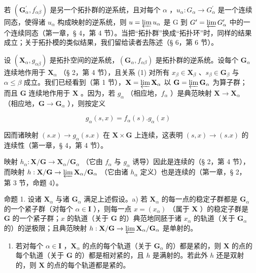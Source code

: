 若 \((\mathbf{G}_{\alpha}^{\prime}, f_{\alpha\beta}^{\prime})\) 是另一个拓扑群的逆系统，且对每个 \(\alpha\) ，\(u_{\alpha}: G_{\alpha} \to G_{\alpha}^{\prime}\) 是一个连续同态，使得诸 \(u_{\alpha}\) 构成映射的逆系统，则 \(u = \varprojlim u_{\alpha}\) 是 G 到 \(G^{\prime} = \varprojlim G_{\alpha}^{\prime}\) 中的一个连续同态（第一章，§ 4，第 4 节）。当把“拓扑群”换成“拓扑环”时，同样的结果成立；关于拓扑模的类似结果，我们留给读者去陈述（§ 6，第 6 节）。

设 \((\mathbf{X}_{\alpha}, g_{\alpha \beta})\) 是拓扑空间的逆系统，\((\mathbf{G}_{\alpha}, f_{\alpha \beta})\) 是拓扑群的逆系统。设每个 \(\mathbf{G}_{\alpha}\) 连续地作用于 \(\mathbf{X}_{\alpha}\) （§ 2，第 4 节），且关系 (1) 对所有 \(x_{\beta} \in \mathbf{X}_{\beta}\) 、\(s_{\beta} \in \mathbf{G}_{\beta}\) 与 \(\alpha \leqslant \beta\) 成立。我们已经看到（第 1 节），\(\mathbf{X} = \varprojlim \mathbf{X}_{\alpha}\) 以 \(\mathbf{G} = \varprojlim \mathbf{G}_{\alpha}\) 为算子群；而且 \(\mathbf{G}\) 连续地作用于 \(\mathbf{X}\) 。因为，若 \(g_{\alpha}\) （相应地，\(f_{\alpha}\) ）是典范映射 \(\mathbf{X} \to \mathbf{X}_{\alpha}\) （相应地，\(\mathbf{G} \to \mathbf{G}_{\alpha}\) ），则按定义

\[
g _ {\alpha} (s, x) = f _ {\alpha} (s). g _ {\alpha} (x)
\]

因而诸映射 \((s.x) \to g_{\alpha}(s.x)\) 在 \(\mathbf{X} \times \mathbf{G}\) 上连续，这表明 \((s, x) \to (s.x)\) 的连续性（第一章，§ 4，第 4 节）。

映射 \(h_{\alpha}: \mathbf{X} / \mathbf{G} \to \mathbf{X}_{\alpha} / \mathbf{G}_{\alpha}\) （它由 \(f_{\alpha}\) 与 \(g_{\alpha}\) 诱导）因此是连续的（§ 2，第 4 节），而映射 \(h: \mathbf{X} / \mathbf{G} \to \varprojlim \mathbf{X}_{\alpha} / \mathbf{G}_{\alpha}\) （它由诸 \(h_{\alpha}\) 定义）也是连续的（第一章，§ 2，第 3 节，命题 4）。

命题 1. 设诸 \(\mathbf{X}_{\alpha}\) 与诸 \(\mathbf{G}_{\alpha}\) 满足上述假设。a) 若 \(\mathbf{X}_{\alpha}\) 的每一点的稳定子群都是 \(\mathbf{G}_{\alpha}\) 的一个紧子群（对每个 \(\alpha \in \mathbf{I}\) ），则每一点 \(x = (x_{\alpha})\) （属于 \(\mathbf{X}\) ）的稳定子群是 \(\mathbf{G}\) 的一个紧子群；\(x\) 的轨道（关于 \(\mathbf{G}\) 的）典范地同胚于诸 \(x_{\alpha}\) 的轨道（关于 \(\mathbf{G}_{\alpha}\) 的）的逆极限；且典范映射 \(h: \mathbf{X} / \mathbf{G} \to \varprojlim \mathbf{X}_{\alpha} / \mathbf{G}_{\alpha}\) 是单射的。

\begin{enumerate}
\def\labelenumi{\alph{enumi})}
\setcounter{enumi}{1}
\tightlist
\item
  若对每个 \(\alpha \in \mathbf{I}\) ，\(\mathbf{X}_{\alpha}\) 的点的每个轨道（关于 \(\mathbf{G}_{\alpha}\) 的）都是紧的，则 \(\mathbf{X}\) 的点的每个轨道（关于 \(\mathbf{G}\) 的）都是相对紧的，且 \(h\) 是满射的。若此外 \(h\) 还是双射的，则 \(\mathbf{X}\) 的点的每个轨道都是紧的。
\end{enumerate}

